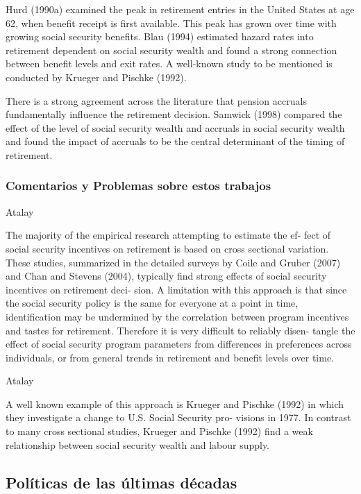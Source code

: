 \documentclass[]{article}
\begin{document}
Hurd (1990a) examined the peak in retirement entries in the United
States at age 62, when benefit receipt is first available. This peak has
grown over time with growing social security benefits. Blau (1994)
estimated hazard rates into retirement dependent on social security
wealth and found a strong connection between benefit levels and exit
rates. A well-known study to be mentioned is conducted by Krueger and
Pischke (1992).

There is a strong agreement across the literature that pension accruals
fundamentally influence the retirement decision. Samwick (1998) compared
the effect of the level of social security wealth and accruals in social
security wealth and found the impact of accruals to be the central
determinant of the timing of retirement.

\hypertarget{comentarios-y-problemas-sobre-estos-trabajos}{%
\subsubsection{Comentarios y Problemas sobre estos
trabajos}\label{comentarios-y-problemas-sobre-estos-trabajos}}

Atalay

The majority of the empirical research attempting to estimate the ef-
fect of social security incentives on retirement is based on cross
sectional variation. These studies, summarized in the detailed surveys
by Coile and Gruber (2007) and Chan and Stevens (2004), typically find
strong effects of social security incentives on retirement deci- sion. A
limitation with this approach is that since the social security policy
is the same for everyone at a point in time, identification may be
undermined by the correlation between program incentives and tastes for
retirement. Therefore it is very difficult to reliably disen- tangle the
effect of social security program parameters from differences in
preferences across individuals, or from general trends in retirement and
benefit levels over time.

Atalay

A well known example of this approach is Krueger and Pischke (1992) in
which they investigate a change to U.S. Social Security pro- visions in
1977. In contrast to many cross sectional studies, Krueger and Pischke
(1992) find a weak relationship between social security wealth and
labour supply.

\hypertarget{poluxedticas-de-las-uxfaltimas-duxe9cadas}{%
\subsection{Políticas de las últimas
décadas}\label{poluxedticas-de-las-uxfaltimas-duxe9cadas}}
\end{document}
